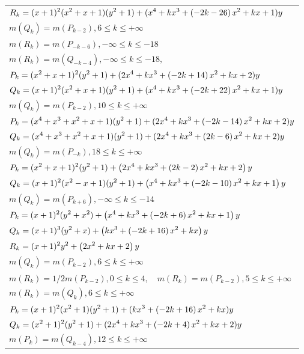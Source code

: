 \documentclass{amsart}
\begin{document}
\begin{longtable}{|l|}
\(\displaystyle R_k=(x
 + 1)^{2}(x^2
 + x
 + 1)(y^2+1)+(x^4
 + k\*x^3
 + \left(-2\*k
 - 26\right) \*x^2
 + k\*x
 + 1)y\)\\
\(\displaystyle m(Q_k) = m(P_{k
 - 2}),6 \leqslant k \leqslant +\infty\)\\
\(\displaystyle m(R_k) = m(P_{-k
 - 6}),-\infty \leqslant k \leqslant -18\)\\
\(\displaystyle m(R_k) = m(Q_{-k
 - 4}),-\infty \leqslant k \leqslant -18,\quad \)\\
\hline
\(\displaystyle P_k=(x^2
 + x
 + 1)^{2}(y^2+1)+(2\*x^4
 + k\*x^3
 + \left(-2\*k
 + 14\right) \*x^2
 + k\*x
 + 2)y\)\\
\(\displaystyle Q_k=(x
 + 1)^{2}(x^2
 + x
 + 1)(y^2+1)+(x^4
 + k\*x^3
 + \left(-2\*k
 + 22\right) \*x^2
 + k\*x
 + 1)y\)\\
\(\displaystyle m(Q_k) = m(P_{k
 - 2}),10 \leqslant k \leqslant +\infty\)\\
\hline
\(\displaystyle P_k=(x^4
 + x^3
 + x^2
 + x
 + 1)(y^2+1)+(2\*x^4
 + k\*x^3
 + \left(-2\*k
 - 14\right) \*x^2
 + k\*x
 + 2)y\)\\
\(\displaystyle Q_k=(x^4
 + x^3
 + x^2
 + x
 + 1)(y^2+1)+(2\*x^4
 + k\*x^3
 + \left(2\*k
 - 6\right) \*x^2
 + k\*x
 + 2)y\)\\
\(\displaystyle m(Q_k) = m(P_{-k}),18 \leqslant k \leqslant +\infty\)\\
\hline
\(\displaystyle P_k= (x^2+x+1)^2 \*(y^2+1)
 + \left(2\*x^4
 + k\*x^3
 + \left(2\*k
 - 2\right) \*x^2
 + k\*x
 + 2\right) \*y
 \)\\
\(\displaystyle Q_k= (x+1)^2(x^2 - x + 1) \*(y^2+1)
 + \left(x^4
 + k\*x^3
 + \left(-2\*k
 - 10\right) \*x^2
 + k\*x
 + 1\right) \*y
 \)\\
 \(\displaystyle m(Q_k) = m(P_{k
 + 6}),-\infty \leqslant k \leqslant -14\)\\
\hline
\(\displaystyle P_k= (x+1)^2 \*(y^2+x^2)
 + \left(x^4
 + k\*x^3
 + \left(-2\*k
 + 6\right) \*x^2
 + k\*x
 + 1\right) \*y
 \)\\
\(\displaystyle Q_k= (x+1)^3 \*(y^2+x)
 + \left(k\*x^3
 + \left(-2\*k
 + 16\right) \*x^2
 + k\*x\right) \*y
 \)\\
\(\displaystyle R_k= (x+1)^2 \*y^2
 + \left(2\*x^2
 + k\*x
 + 2\right) \*y
\)\\
 \(\displaystyle m(Q_k) = m(P_{k
 - 2}),6 \leqslant k \leqslant +\infty\)\\
\(\displaystyle m(R_k) = 1/2m(P_{k
 - 2}),0 \leqslant k \leqslant 4,\quad m(R_k) = m(P_{k
 - 2}),5 \leqslant k \leqslant +\infty\)\\
\(\displaystyle m(R_k) = m(Q_{k}),6 \leqslant k \leqslant +\infty\)\\
\hline
\(\displaystyle P_k=(x
 + 1)^{2}(x^2
 + 1)(y^2+1)+(k\*x^3
 + \left(-2\*k
 + 16\right) \*x^2
 + k\*x)y\)\\
 \(\displaystyle Q_k=(x^2
 + 1)^{2}(y^2+1)+(2\*x^4
 + k\*x^3
 + \left(-2\*k
 + 4\right) \*x^2
 + k\*x
 + 2)y\)\\
\(\displaystyle m(P_k) = m(Q_{k
 - 4}),12 \leqslant k \leqslant +\infty\)\\
 \hline
\end{longtable}
\end{document}
